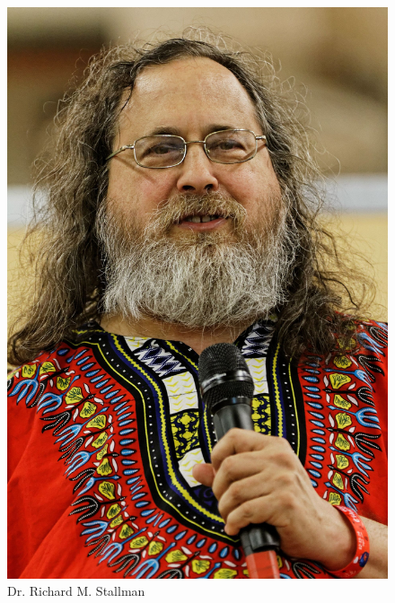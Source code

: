 \documentclass[12pt]{article}
\begin{document}
\begin{multicols}{3}
  \begin{figure}
  \includegraphics[width=\linewidth]{Images/Stallman.jpeg}
  \caption{\tiny Dr. Richard M. Stallman}
  \end{figure}

  \vfill


\end{multicols}
\end{document}
